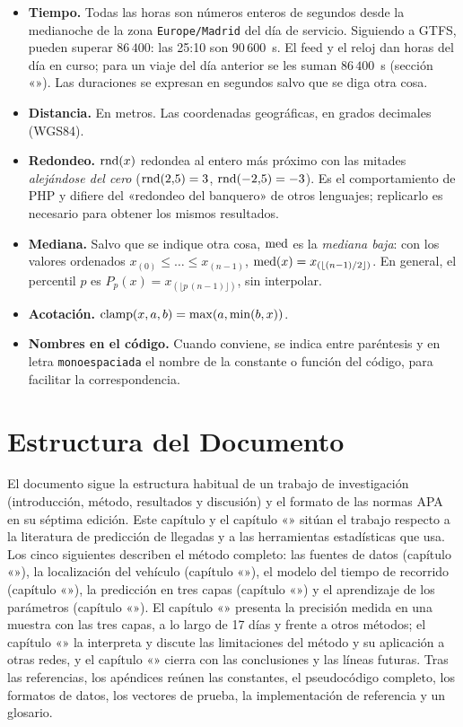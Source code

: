 \begin{itemize}
  \item \textbf{Tiempo.} Todas las horas son números enteros de segundos desde la medianoche de la zona
        \texttt{Europe/Madrid} del día de servicio. Siguiendo a GTFS, pueden superar $86\,400$: las 25:10 son
        $90\,600$~s. El feed y el reloj dan horas del día en curso; para un viaje del día anterior se les suman
        $86\,400$~s (sección «»). Las duraciones se expresan en segundos salvo que se diga otra
        cosa.
  \item \textbf{Distancia.} En metros. Las coordenadas geográficas, en grados decimales (WGS84).
  \item \textbf{Redondeo.} $\operatorname{rnd}(x)$ redondea al entero más próximo con las mitades \emph{alejándose del cero}
        ($\operatorname{rnd}(2{,}5)=3$, $\operatorname{rnd}(-2{,}5)=-3$). Es el comportamiento de PHP y difiere del «redondeo del
        banquero» de otros lenguajes; replicarlo es necesario para obtener los mismos resultados.
  \item \textbf{Mediana.} Salvo que se indique otra cosa, $\operatorname{med}$ es la \emph{mediana baja}: con los valores
        ordenados $x_{(0)}\le\dots\le x_{(n-1)}$, $\operatorname{med}(x)=x_{(\lfloor (n-1)/2\rfloor)}$. En general, el percentil
        $p$ es $P_p(x)=x_{(\lfloor p\,(n-1)\rfloor)}$, sin interpolar.
  \item \textbf{Acotación.} $\operatorname{clamp}(x,a,b)=\max(a,\min(b,x))$.
  \item \textbf{Nombres en el código.} Cuando conviene, se indica entre paréntesis y en letra \texttt{monoespaciada} el
        nombre de la constante o función del código, para facilitar la correspondencia.
\end{itemize}

\section{Estructura del Documento}

El documento sigue la estructura habitual de un trabajo de investigación (introducción, método, resultados y
discusión) y el formato de las normas APA en su séptima edición. Este capítulo y el capítulo «»
sitúan el trabajo respecto a la literatura de predicción de llegadas y a las herramientas estadísticas que usa. Los
cinco siguientes describen el método completo: las fuentes de datos (capítulo «»), la localización del
vehículo (capítulo «»), el modelo del tiempo de recorrido (capítulo «»), la
predicción en tres capas (capítulo «») y el aprendizaje de los parámetros
(capítulo «»). El capítulo «» presenta la precisión medida en una muestra
con las tres capas, a lo largo de 17 días y frente a otros métodos; el capítulo «» la interpreta y
discute las limitaciones del método y su aplicación a otras redes, y el capítulo «» cierra con las
conclusiones y las líneas futuras. Tras las referencias, los apéndices reúnen las constantes, el pseudocódigo
completo, los formatos de datos, los vectores de prueba, la implementación de referencia y un glosario.
